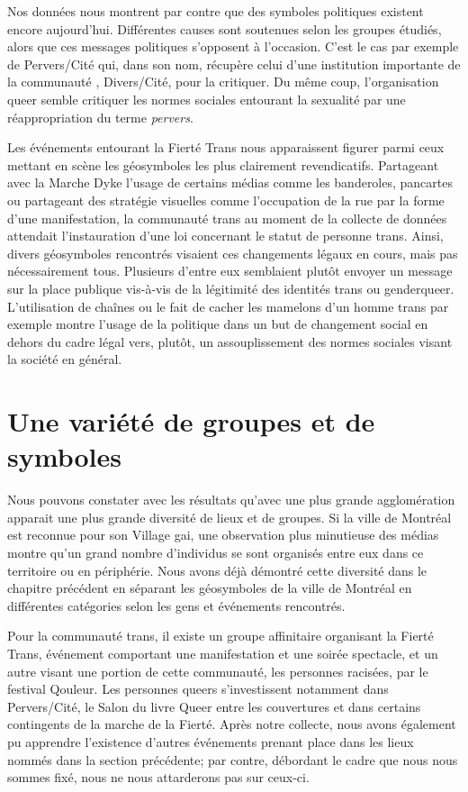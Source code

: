 Nos données nous montrent par contre que des symboles politiques existent encore aujourd'hui.
Différentes causes sont soutenues selon les groupes étudiés, alors que ces messages politiques s'opposent à l'occasion.
C'est le cas par exemple de Pervers/Cité qui, dans son nom, récupère celui d'une institution importante de la communauté \lgbt{}, Divers/Cité, pour la critiquer.
Du même coup, l'organisation queer semble critiquer les normes sociales entourant la sexualité par une réappropriation du terme \emph{pervers}.

Les événements entourant la Fierté Trans nous apparaissent figurer parmi ceux mettant en scène les géosymboles les plus clairement revendicatifs.
Partageant avec la Marche Dyke l'usage de certains médias comme les banderoles, pancartes ou partageant des stratégie visuelles comme l'occupation de la rue par la forme d'une manifestation, la communauté trans au moment de la collecte de données attendait l'instauration d'une loi concernant le statut de personne trans.
Ainsi, divers géosymboles rencontrés visaient ces changements légaux en cours, mais pas nécessairement tous.
Plusieurs d'entre eux semblaient plutôt envoyer un message sur la place publique vis-à-vis de la légitimité des identités trans ou genderqueer.
L'utilisation de chaînes ou le fait de cacher les mamelons d'un homme trans par exemple montre l'usage de la politique dans un but de changement social en dehors du cadre légal vers, plutôt, un assouplissement des normes sociales visant la société en général.

\section{Une variété de groupes et de symboles}
\label{sec:une_variete_de_groupes_et_de_symboles}
Nous pouvons constater avec les résultats qu'avec une plus grande agglomération apparait une plus grande diversité de lieux et de groupes.
Si la ville de Montréal est reconnue pour son Village gai, une observation plus minutieuse des médias \lgbt{} montre qu'un grand nombre d'individus se sont organisés entre eux dans ce territoire ou en périphérie.
Nous avons déjà démontré cette diversité dans le chapitre précédent en séparant les géosymboles de la ville de Montréal en différentes catégories selon les gens et événements rencontrés.

Pour la communauté trans, il existe un groupe affinitaire organisant la Fierté Trans, événement comportant une manifestation et une soirée spectacle, et un autre visant une portion de cette communauté, les personnes racisées, par le festival Qouleur.
Les personnes queers s'investissent notamment dans Pervers/Cité, le Salon du livre Queer entre les couvertures et dans certains contingents de la marche de la Fierté.
Après notre collecte, nous avons également pu apprendre l'existence d'autres événements prenant place dans les lieux nommés dans la section précédente; par contre, débordant le cadre que nous nous sommes fixé, nous ne nous attarderons pas sur ceux-ci.

